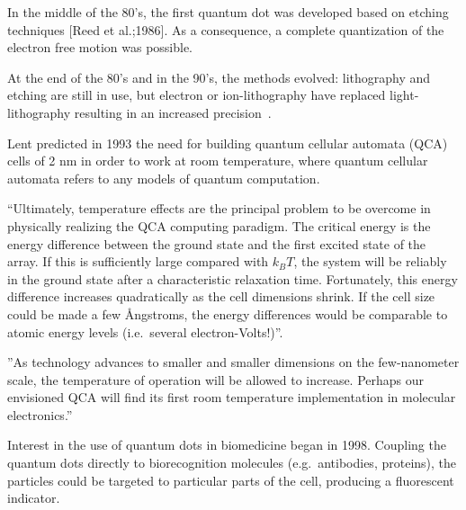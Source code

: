 In the middle of the 80's, the first quantum dot was developed based on etching techniques [Reed et al.;1986]. As a consequence, a complete quantization of the electron free motion was possible.

At the end of the 80's and in the 90's, the methods evolved: lithography and etching are still in use, but electron or ion-lithography have replaced light-lithography resulting in an  increased precision~\cite{Heinzel2003}.


Lent predicted in 1993 the need for building quantum cellular automata (QCA) cells of 2 nm in order to work at room temperature, where quantum cellular automata refers to any models of quantum computation. %
 
``Ultimately, temperature effects are the principal problem to be overcome in physically realizing the QCA computing paradigm. The critical energy is the energy difference between the ground state and the first excited state of the array. If this is sufficiently large compared with $k_B T$, the system will be reliably in the ground state after a characteristic relaxation time. Fortunately, this energy difference increases quadratically as the cell dimensions shrink. If the cell size could be made a few \AA{}ngstroms, the energy differences would be comparable to atomic energy levels (i.e.\ several electron-Volts!)''.

''As technology advances to smaller and smaller dimensions on the few-nanometer scale, the temperature of operation will be allowed to increase. Perhaps our envisioned QCA will find its first room temperature implementation in molecular electronics.''\cite{Lent1993}

Interest in the use of quantum dots in biomedicine began in 1998. Coupling the quantum dots directly to biorecognition molecules (e.g.\ antibodies, proteins), the particles could be targeted to particular parts of the cell, producing a fluorescent indicator\cite{Bruchez1998,Chan1998}.


